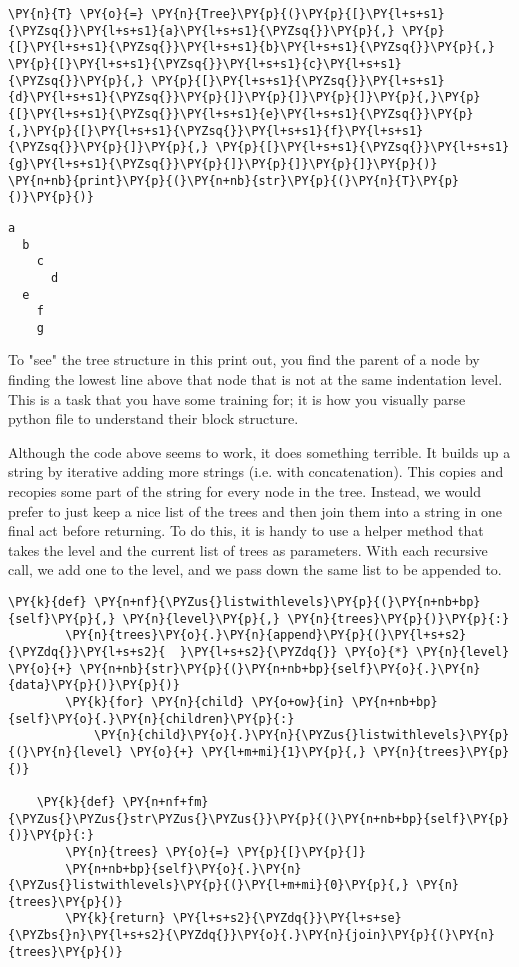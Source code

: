 \begin{Verbatim}[commandchars=\\\{\}]
\PY{n}{T} \PY{o}{=} \PY{n}{Tree}\PY{p}{(}\PY{p}{[}\PY{l+s+s1}{\PYZsq{}}\PY{l+s+s1}{a}\PY{l+s+s1}{\PYZsq{}}\PY{p}{,} \PY{p}{[}\PY{l+s+s1}{\PYZsq{}}\PY{l+s+s1}{b}\PY{l+s+s1}{\PYZsq{}}\PY{p}{,} \PY{p}{[}\PY{l+s+s1}{\PYZsq{}}\PY{l+s+s1}{c}\PY{l+s+s1}{\PYZsq{}}\PY{p}{,} \PY{p}{[}\PY{l+s+s1}{\PYZsq{}}\PY{l+s+s1}{d}\PY{l+s+s1}{\PYZsq{}}\PY{p}{]}\PY{p}{]}\PY{p}{]}\PY{p}{,}\PY{p}{[}\PY{l+s+s1}{\PYZsq{}}\PY{l+s+s1}{e}\PY{l+s+s1}{\PYZsq{}}\PY{p}{,}\PY{p}{[}\PY{l+s+s1}{\PYZsq{}}\PY{l+s+s1}{f}\PY{l+s+s1}{\PYZsq{}}\PY{p}{]}\PY{p}{,} \PY{p}{[}\PY{l+s+s1}{\PYZsq{}}\PY{l+s+s1}{g}\PY{l+s+s1}{\PYZsq{}}\PY{p}{]}\PY{p}{]}\PY{p}{]}\PY{p}{)}
\PY{n+nb}{print}\PY{p}{(}\PY{n+nb}{str}\PY{p}{(}\PY{n}{T}\PY{p}{)}\PY{p}{)}
\end{Verbatim}

\begin{Verbatim}
a
  b
    c
      d
  e
    f
    g
\end{Verbatim}


To "see" the tree structure in this print out, you find the parent of a node by finding the lowest line above that node that is not at the same indentation level.
This is a task that you have some training for; it is how you visually parse python file to understand their block structure.


Although the code above seems to work, it does something terrible.
It builds up a string by iterative adding more strings (i.e. with concatenation).
This copies and recopies some part of the string for every node in the tree.
Instead, we would prefer to just keep a nice list of the trees and then join them into a string in one final act before returning.
To do this, it is handy to use a helper method that takes the level and the current list of trees as parameters.
With each recursive call, we add one to the level, and we pass down the same list to be appended to.

\begin{Verbatim}[commandchars=\\\{\}]
    \PY{k}{def} \PY{n+nf}{\PYZus{}listwithlevels}\PY{p}{(}\PY{n+nb+bp}{self}\PY{p}{,} \PY{n}{level}\PY{p}{,} \PY{n}{trees}\PY{p}{)}\PY{p}{:}
        \PY{n}{trees}\PY{o}{.}\PY{n}{append}\PY{p}{(}\PY{l+s+s2}{\PYZdq{}}\PY{l+s+s2}{  }\PY{l+s+s2}{\PYZdq{}} \PY{o}{*} \PY{n}{level} \PY{o}{+} \PY{n+nb}{str}\PY{p}{(}\PY{n+nb+bp}{self}\PY{o}{.}\PY{n}{data}\PY{p}{)}\PY{p}{)}
        \PY{k}{for} \PY{n}{child} \PY{o+ow}{in} \PY{n+nb+bp}{self}\PY{o}{.}\PY{n}{children}\PY{p}{:}
            \PY{n}{child}\PY{o}{.}\PY{n}{\PYZus{}listwithlevels}\PY{p}{(}\PY{n}{level} \PY{o}{+} \PY{l+m+mi}{1}\PY{p}{,} \PY{n}{trees}\PY{p}{)}

    \PY{k}{def} \PY{n+nf+fm}{\PYZus{}\PYZus{}str\PYZus{}\PYZus{}}\PY{p}{(}\PY{n+nb+bp}{self}\PY{p}{)}\PY{p}{:}
        \PY{n}{trees} \PY{o}{=} \PY{p}{[}\PY{p}{]}
        \PY{n+nb+bp}{self}\PY{o}{.}\PY{n}{\PYZus{}listwithlevels}\PY{p}{(}\PY{l+m+mi}{0}\PY{p}{,} \PY{n}{trees}\PY{p}{)}
        \PY{k}{return} \PY{l+s+s2}{\PYZdq{}}\PY{l+s+se}{\PYZbs{}n}\PY{l+s+s2}{\PYZdq{}}\PY{o}{.}\PY{n}{join}\PY{p}{(}\PY{n}{trees}\PY{p}{)}
\end{Verbatim}



